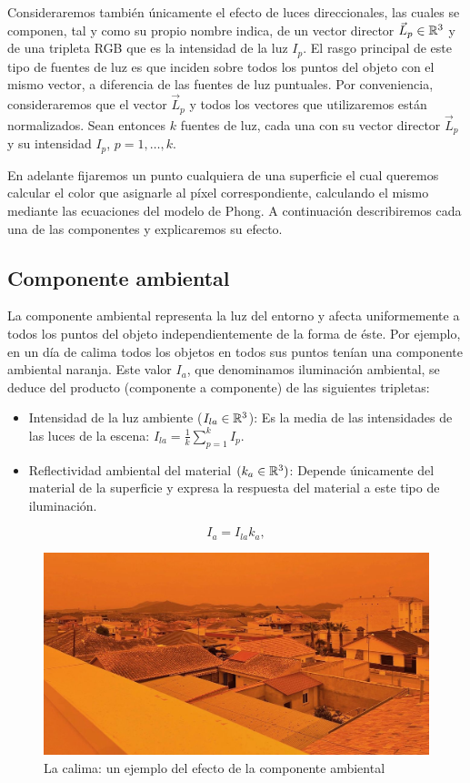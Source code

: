 Consideraremos también únicamente el efecto de luces direccionales, las cuales se componen, tal y como su propio nombre indica, de un vector director $\vec L_p\in\mathbb{R}^3$ y de una tripleta RGB que es la intensidad de la luz $I_p$. El rasgo principal de este tipo de fuentes de luz es que inciden sobre todos los puntos del objeto con el mismo vector, a diferencia de las fuentes de luz puntuales. Por conveniencia, consideraremos que el vector $\vec L_p$ y todos los vectores que utilizaremos están normalizados. Sean entonces $k$ fuentes de luz, cada una con su vector director $\vec L_p$ y su intensidad $I_p$, $p=1,\dots,k$.

En adelante fijaremos un punto cualquiera de una superficie el cual queremos calcular el color que asignarle al píxel correspondiente, calculando el mismo mediante las ecuaciones del modelo de Phong. A continuación describiremos cada una de las componentes y explicaremos su efecto.

\subsection{Componente ambiental}

La componente ambiental representa la luz del entorno y afecta uniformemente a todos los puntos del objeto independientemente de la forma de éste. Por ejemplo, en un día de calima todos los objetos en todos sus puntos tenían una componente ambiental naranja. Este valor $I_a$, que denominamos iluminación ambiental, se deduce del producto (componente a componente) de las siguientes tripletas:
\begin{itemize}
    \item Intensidad de la luz ambiente ($I_{la}\in\mathbb{R}^3$): Es la media de las intensidades de las luces de la escena: $I_{la}=\frac{1}{k}\sum_{p=1}^k I_p$.
    \item Reflectividad ambiental del material $(k_a\in\mathbb{R}^3)$: Depende únicamente del material de la superficie y expresa la respuesta del material a este tipo de iluminación. 
\end{itemize}
\begin{equation}
    I_a = I_{la} k_a,
\end{equation}

\begin{figure} [ht]
    \centering
    \includegraphics[scale = 0.2]{img/C8/calima.jpg}
    \caption{La calima: un ejemplo del efecto de la componente ambiental}
    \label{fig:calima}
\end{figure}

